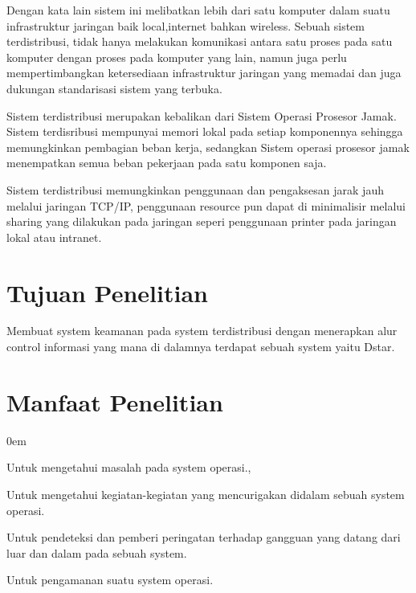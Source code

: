 \documentclass{jtetiproposalskripsi}
\begin{document}
Dengan kata lain sistem ini melibatkan lebih dari satu komputer dalam suatu infrastruktur jaringan baik local,internet bahkan wireless. Sebuah sistem terdistribusi, tidak hanya melakukan komunikasi antara satu proses pada satu komputer dengan proses pada komputer yang lain, namun juga perlu mempertimbangkan ketersediaan infrastruktur jaringan yang memadai dan juga dukungan standarisasi sistem yang terbuka.

Sistem terdistribusi merupakan kebalikan dari Sistem Operasi Prosesor Jamak. Sistem terdisribusi mempunyai memori lokal pada setiap komponennya sehingga memungkinkan pembagian beban kerja, sedangkan Sistem operasi prosesor jamak menempatkan semua beban pekerjaan pada satu komponen saja.

Sistem terdistribusi memungkinkan penggunaan dan pengaksesan jarak jauh melalui jaringan TCP/IP, penggunaan resource pun dapat di minimalisir melalui sharing yang dilakukan pada jaringan seperi penggunaan printer pada jaringan lokal atau intranet.



\section{Tujuan Penelitian}
Membuat system keamanan pada system terdistribusi dengan menerapkan alur control informasi yang mana di dalamnya terdapat sebuah system yaitu Dstar.

\section{Manfaat Penelitian}




	

\vspace{-0.5cm}

\begin{enumerate}[a.]
\begin{singlespace}
\itemsep0em
\item Untuk mengetahui masalah pada system operasi.,
\item Untuk mengetahui kegiatan-kegiatan yang mencurigakan didalam sebuah system operasi.
\item Untuk pendeteksi dan pemberi peringatan terhadap 		gangguan yang datang dari luar dan dalam pada sebuah system.
\item Untuk pengamanan suatu system operasi.
\end{singlespace}
\end{enumerate}
	
\end{document}
